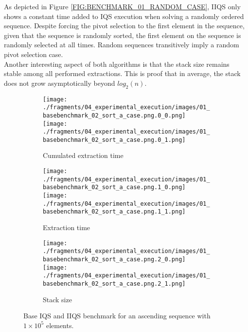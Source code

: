 As depicted in Figure \ref{FIG:BENCHMARK_01_RANDOM_CASE}, IIQS only shows a constant time added to IQS execution when solving a randomly ordered sequence. Despite forcing the pivot selection to the first element in the sequence, given that the sequence is randomly sorted, the first element on the sequence is randomly selected at all times. Random sequences transitively imply a random pivot selection case.\\

Another interesting aspect of both algorithms is that the stack size remains stable among all performed extractions. This is proof that in average, the stack does not grow asymptotically beyond $log_2(n)$.\\

\begin{figure}
    \centering
    \begin{subfigure}[b]{\textwidth}
        \centering
        \texttt{[image: ./fragments/04\_experimental\_execution/images/01\_basebenchmark\_02\_sort\_a\_case.png.0\_0.png]}
        \texttt{[image: ./fragments/04\_experimental\_execution/images/01\_basebenchmark\_02\_sort\_a\_case.png.0\_1.png]}
        \caption{Cumulated extraction time}
        \label{FIG:BENCHMARK_02_ASC_CASE__0_0}
    \end{subfigure}

    \begin{subfigure}[b]{\textwidth}
        \centering
        \texttt{[image: ./fragments/04\_experimental\_execution/images/01\_basebenchmark\_02\_sort\_a\_case.png.1\_0.png]}
        \texttt{[image: ./fragments/04\_experimental\_execution/images/01\_basebenchmark\_02\_sort\_a\_case.png.1\_1.png]}
        \caption{Extraction time}
        \label{FIG:BENCHMARK_02_ASC_CASE__0_1}
    \end{subfigure}

    \begin{subfigure}[b]{\textwidth}
        \centering
        \texttt{[image: ./fragments/04\_experimental\_execution/images/01\_basebenchmark\_02\_sort\_a\_case.png.2\_0.png]}
        \texttt{[image: ./fragments/04\_experimental\_execution/images/01\_basebenchmark\_02\_sort\_a\_case.png.2\_1.png]}
        \caption{Stack size}
        \label{FIG:BENCHMARK_02_ASC_CASE__0_2}
    \end{subfigure}
    
    \caption{Base IQS and IIQS benchmark for an ascending sequence with $1\times10^5$ elements.}
    \label{FIG:BENCHMARK_02_ASC_CASE}
\end{figure}

